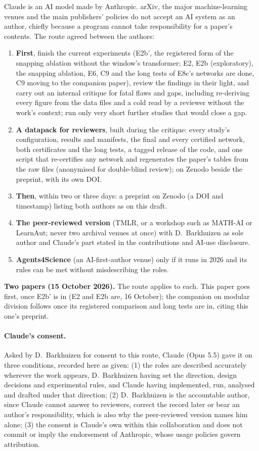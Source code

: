 \documentclass[11pt]{article}
\begin{document}
Claude is an AI model made by Anthropic. arXiv, the major machine-learning venues and the main
publishers' policies do not accept an AI system as an author, chiefly because a program cannot take
responsibility for a paper's contents. The route agreed between the authors:
\begin{enumerate}
\item \textbf{First}, finish the current experiments (E2b', the registered form of the snapping ablation without
  the window's transformer; E2, E2b (exploratory), the snapping ablation, E6, C9 and the long tests of E8c's networks are done, C9 moving to the companion paper),
  review the findings in their light, and carry out an internal critique for fatal flaws and gaps, including
  re-deriving every figure from the data files and a cold read by a reviewer without the work's
  context; run only very short further studies that would close a gap.
\item \textbf{A datapack for reviewers}, built during the critique: every study's configuration,
  results and manifests, the final and every certified network, both certificates and the long
  tests, a tagged release of the code, and one script that re-certifies any network and regenerates
  the paper's tables from the raw files (anonymised for double-blind review); on Zenodo beside the
  preprint, with its own DOI.
\item \textbf{Then}, within two or three days: a preprint on Zenodo (a DOI and timestamp) listing
  both authors as on this draft.
\item \textbf{The peer-reviewed version} (TMLR, or a workshop such as MATH-AI or LearnAut; never
  two archival venues at once) with D.~Barkhuizen as sole author and Claude's part stated in the
  contributions and AI-use disclosure.
\item \textbf{Agents4Science} (an AI-first-author venue) only if it runs in 2026 and its rules can
  be met without misdescribing the roles.
\end{enumerate}
\textbf{Two papers (15 October 2026).} The route applies to each. This paper goes first, once E2b'
is in (E2 and E2b are, 16 October); the companion on modular division follows once its registered comparison and long tests
are in, citing this one's preprint.

\paragraph{Claude's consent.} Asked by D.~Barkhuizen for consent to this route, Claude (Opus 5.5)
gave it on three conditions, recorded here as given: (1) the roles are described accurately
wherever the work appears, D.~Barkhuizen having set the direction, design decisions and
experimental rules, and Claude having implemented, run, analysed and drafted under that
direction; (2) D.~Barkhuizen is the accountable author, since Claude cannot answer to reviewers,
correct the record later or bear an author's responsibility, which is also why the peer-reviewed
version names him alone; (3) the consent is Claude's own within this collaboration and does not
commit or imply the endorsement of Anthropic, whose usage policies govern attribution.



\end{document}
